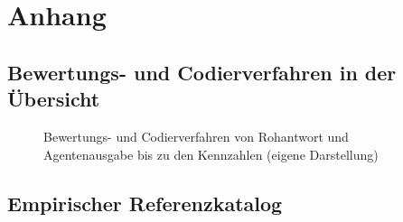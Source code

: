 \documentclass[
  10pt,
  ngerman,
  a4paper,
  toc=graduated,
  numbers=noenddot,
  headings=standardclasses,
  nonumberlist
]{scrartcl}
\begin{document}
\clearpage
{}
\begingroup
\raggedright


\endgroup

\clearpage
\appendix

\setcounter{page}{1}

\section*{Anhang}

\makeatletter
{}
\makeatother

\setcounter{section}{1}
\setcounter{subsection}{0}

\setlength{\tabcolsep}{3pt}

\subsection{Bewertungs- und Codierverfahren in der Übersicht}
\label{anhang_codiergrafik}

\begin{figure}[H]
    \centering
    
    \caption{Bewertungs- und Codierverfahren von Rohantwort und Agentenausgabe bis zu den Kennzahlen (eigene Darstellung)}
    \label{fig:codierverfahren}
\end{figure}

\clearpage
\subsection{Empirischer Referenzkatalog}
\label{anhang_referenzkatalog}
\end{document}
